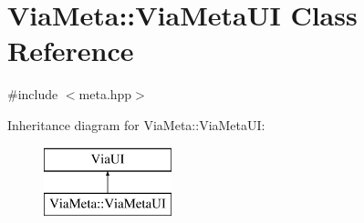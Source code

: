 \hypertarget{class_via_meta_1_1_via_meta_u_i}{}\section{Via\+Meta\+:\+:Via\+Meta\+UI Class Reference}
\label{class_via_meta_1_1_via_meta_u_i}


{\ttfamily \#include $<$meta.\+hpp$>$}

Inheritance diagram for Via\+Meta\+:\+:Via\+Meta\+UI\+:\begin{figure}[H]
\begin{center}
\leavevmode
\includegraphics[height=2.000000cm]{class_via_meta_1_1_via_meta_u_i}
\end{center}
\end{figure}
